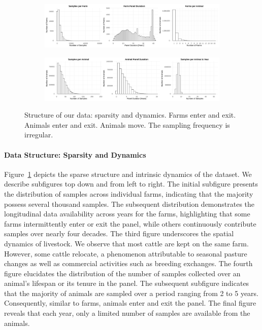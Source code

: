 \begin{figure}[H]
    \centering
    \begin{subfigure}[b]{\textwidth}
        \centering
        \includegraphics[width=\textwidth]{thesis/figures/dataset/dataset_structure_1.png}
    \end{subfigure}
    \begin{subfigure}[b]{\textwidth}
        \centering
        \includegraphics[width=\textwidth]{thesis/figures/dataset/dataset_structure_2.png}
    \end{subfigure}
    
    \caption{Structure of our data: sparsity and dynamics. Farms enter and exit. Animals enter and exit. Animals move. The sampling frequency is irregular.}
    \label{fig:dataset_structure_sparsity_dynamics}
\end{figure}

\paragraph{Data Structure: Sparsity and Dynamics}
Figure~\ref{fig:dataset_structure_sparsity_dynamics} depicts the sparse structure and intrinsic dynamics of the dataset. We describe subfigures top down and from left to right. The initial subfigure presents the distribution of samples across individual farms, indicating that the majority possess several thousand samples. The subsequent distribution demonstrates the longitudinal data availability across years for the farms, highlighting that some farms intermittently enter or exit the panel, while others continuously contribute samples over nearly four decades. The third figure underscores the spatial dynamics of livestock. We observe that most cattle are kept on the same farm. However, some cattle relocate, a phenomenon attributable to seasonal pasture changes as well as commercial activities such as breeding exchanges. The fourth figure elucidates the distribution of the number of samples collected over an animal's lifespan or its tenure in the panel. The subsequent subfigure indicates that the majority of animals are sampled over a period ranging from 2 to 5 years. Consequently, similar to farms, animals enter and exit the panel. The final figure reveals that each year, only a limited number of samples are available from the animals.

